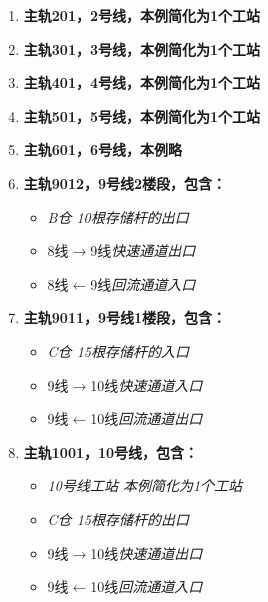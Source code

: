 \begin{enumerate}[label=\hspace{18pt}\arabic*)]
	\item \bf{主轨201}，2号线，本例简化为1个工站
	\item \bf{主轨301}，3号线，本例简化为1个工站
	\item \bf{主轨401}，4号线，本例简化为1个工站
	\item \bf{主轨501}，5号线，本例简化为1个工站
	\item \bf{主轨601}，6号线，本例略
	\item \bf{主轨9012}，9号线2楼段，包含： 
	\begin{itemize}
		\item \it{B仓} 10根存储杆的出口
		\item 8线$\rightarrow$9线\it{快速通道}出口
		\item 8线$\leftarrow$9线\it{回流通道}入口
	\end{itemize}
	\item \bf{主轨9011}，9号线1楼段，包含： 
	\begin{itemize}
		\item \it{C仓} 15根存储杆的入口
		\item 9线$\rightarrow$10线\it{快速通道}入口
		\item 9线$\leftarrow$10线\it{回流通道}出口
	\end{itemize}
	\item \bf{主轨1001}，10号线，包含： 
	\begin{itemize}
		\item \it{10号线工站} 本例简化为1个工站
		\item \it{C仓} 15根存储杆的出口
		\item 9线$\rightarrow$10线\it{快速通道}出口
		\item 9线$\leftarrow$10线\it{回流通道}入口
	\end{itemize}
\end{enumerate}
